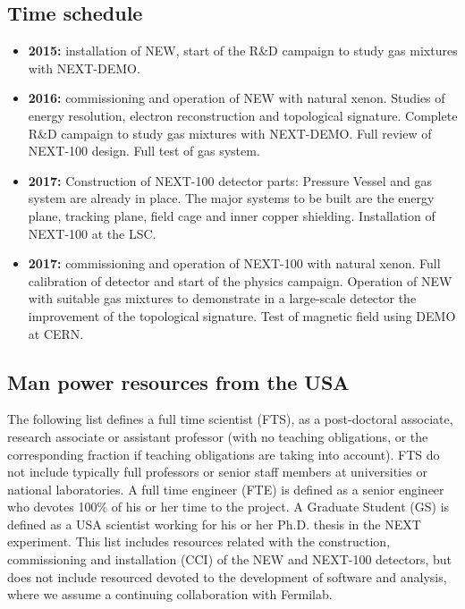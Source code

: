 \subsection{Time schedule}
\begin{itemize}
\item {\bf 2015:} installation of NEW, start of the R\&D campaign to study gas mixtures with NEXT-DEMO.
\item {\bf 2016:} commissioning and operation of NEW with natural xenon. Studies of energy resolution, electron reconstruction and topological signature. Complete R\&D campaign to study gas mixtures with NEXT-DEMO. Full review of NEXT-100 design. Full test of gas system.
\item {\bf 2017:} Construction of NEXT-100 detector parts: Pressure Vessel and gas system are already in place. The major systems to be built are the energy plane, tracking plane, field cage and inner copper shielding. Installation of NEXT-100 at the LSC.
\item {\bf 2017:} commissioning and operation of NEXT-100 with natural xenon. Full calibration of detector and start of the physics campaign. Operation of NEW with suitable gas mixtures to demonstrate in a large-scale detector the improvement of the topological signature. Test of magnetic field using DEMO at CERN. 
\end{itemize}

\subsection{Man power resources from the USA}

The following list defines a full time scientist (FTS), as a post-doctoral associate, research associate or assistant professor (with no teaching obligations, or the corresponding fraction if teaching obligations are taking into account). FTS do not include typically full professors or senior staff members at universities or national laboratories. A full time engineer (FTE) is defined as a senior engineer who devotes 100\% of his or her time to the project. A Graduate Student (GS) is defined as a USA scientist working for his or her Ph.D. thesis in the NEXT experiment. This list includes resources related with the construction, commissioning and installation (CCI) of the NEW and NEXT-100 detectors, but does not include resourced devoted to the development of software and analysis, where we assume a continuing collaboration with Fermilab. 

